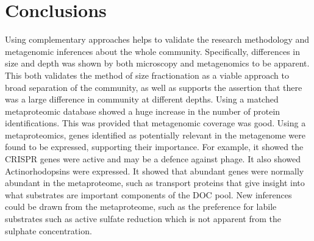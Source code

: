 \section{Conclusions}
Using complementary approaches helps to validate the research methodology and 
metagenomic inferences about the whole community.
Specifically, differences in size and depth was shown by both microscopy and metagenomics to be apparent.
This both validates the method of size fractionation as a viable approach to broad separation of the community,
as well as supports the assertion that there was a large difference in community at different depths.
Using a matched metaproteomic database showed a huge increase in the number of protein identifications.
This was provided that metagenomic coverage was good.
Using a metaproteomics, genes identified as potentially relevant in the metagenome were found to be expressed, supporting their importance.
For example, it showed the CRISPR genes were active and may be a defence against phage.
It also showed Actinorhodopsins were expressed.
It showed that abundant genes were normally abundant in the metaproteome, such as transport proteins that give insight into what substrates are important components of the DOC pool.
New inferences could be drawn from the metaproteome, such as the preference for labile substrates such as active sulfate reduction which is not apparent from the sulphate concentration.



